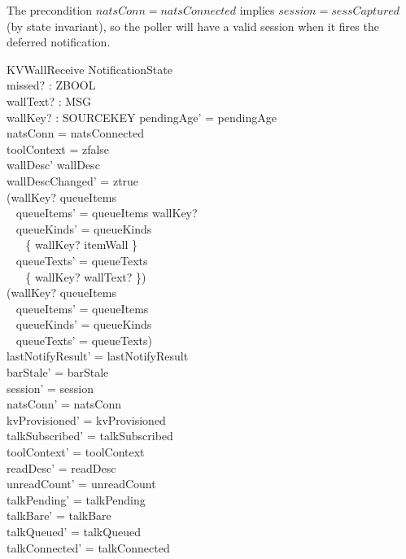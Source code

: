 \documentclass[a4paper,10pt,fleqn]{article}
\begin{document}
The precondition $natsConn = natsConnected$ implies
$session = sessCaptured$ (by state invariant), so the poller will
have a valid session when it fires the deferred notification.

\begin{schema}{KVWallReceive}
  \Delta NotificationState \\
  missed? : ZBOOL \\
  wallText? : MSG \\
  wallKey? : SOURCEKEY
  \where
  pendingAge' = pendingAge \\
  natsConn = natsConnected \\
  toolContext = zfalse \\
  wallDesc' \neq wallDesc \\
  wallDescChanged' = ztrue \\
  (wallKey? \notin \ran queueItems \implies \\
  \quad~ queueItems' = queueItems \cat \langle wallKey? \rangle \land \\
  \quad~ queueKinds' = queueKinds \cup \\
  \quad~ \quad~ \{ wallKey? \mapsto itemWall \} \land \\
  \quad~ queueTexts' = queueTexts \cup \\
  \quad~ \quad~ \{ wallKey? \mapsto wallText? \}) \\
  (wallKey? \in \ran queueItems \implies \\
  \quad~ queueItems' = queueItems \land \\
  \quad~ queueKinds' = queueKinds \land \\
  \quad~ queueTexts' = queueTexts) \\
  lastNotifyResult' = lastNotifyResult \\
  barStale' = barStale \\
  session' = session \\
  natsConn' = natsConn \\
  kvProvisioned' = kvProvisioned \\
  talkSubscribed' = talkSubscribed \\
  toolContext' = toolContext \\
  readDesc' = readDesc \\
  unreadCount' = unreadCount \\
  talkPending' = talkPending \\
  talkBare' = talkBare \\
  talkQueued' = talkQueued \\
  talkConnected' = talkConnected \\

\end{schema}
\end{document}
